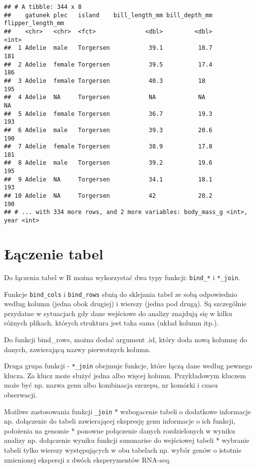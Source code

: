 \documentclass[
]{book}
\begin{document}
\begin{verbatim}
## # A tibble: 344 x 8
##    gatunek plec   island    bill_length_mm bill_depth_mm flipper_length_mm
##    <chr>   <chr>  <fct>              <dbl>         <dbl>             <int>
##  1 Adelie  male   Torgersen           39.1          18.7               181
##  2 Adelie  female Torgersen           39.5          17.4               186
##  3 Adelie  female Torgersen           40.3          18                 195
##  4 Adelie  NA     Torgersen           NA            NA                  NA
##  5 Adelie  female Torgersen           36.7          19.3               193
##  6 Adelie  male   Torgersen           39.3          20.6               190
##  7 Adelie  female Torgersen           38.9          17.8               181
##  8 Adelie  male   Torgersen           39.2          19.6               195
##  9 Adelie  NA     Torgersen           34.1          18.1               193
## 10 Adelie  NA     Torgersen           42            20.2               190
## # ... with 334 more rows, and 2 more variables: body_mass_g <int>, year <int>
\end{verbatim}

\hypertarget{ux142ux105czenie-tabel}{%
\section{Łączenie tabel}\label{ux142ux105czenie-tabel}}

Do łączenia tabel w R można wykorzystać dwa typy funkcji: \texttt{bind\_*} i \texttt{*\_join}.

Funkcje \texttt{bind\_cols} i \texttt{bind\_rows} służą do sklejania tabel ze sobą odpowiednio według kolumn (jedna obok drugiej) i wierszy (jedna pod drugą). Są szczególnie przydatne w sytuacjach gdy dane wejściowe do analizy znajdują się w kilku różnych plikach, których struktura jest taka sama (układ kolumn itp.).

Do funkcji bind\_rows, można dodać argument .id, który doda nową kolumnę do danych, zawierającą nazwy pierwotnych kolumn.

Druga grupa funkcji - \texttt{*\_join} obejmuje funkcje, które łączą dane według pewnego klucza. Za klucz może służyć jedna albo więcej kolumn. Przykładowym kluczem może być np. nazwa genu albo kombinacja szczepu, nr komórki i czasu obserwacji.

Możliwe zastosowania funkcji \texttt{\_join}
* wzbogacenie tabeli o dodatkowe informacje np. dołączenie do tabeli zawierającej ekspresję genu informacje o ich funkcji, położenia na genomie
* ponowne połączenie danych rozdzielonych w wyniku analizy np. dołączenie wyniku funkcji summarise do wejściowej tabeli
* wybranie tabeli tylko wierszy występujących w obu tabelach np. wybór genów o istotnie zmienionej ekspersji z dwóch eksperymentów RNA-seq.
\end{document}
